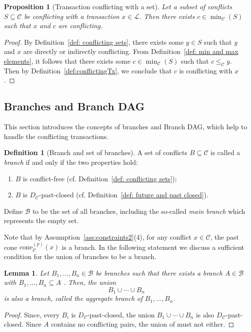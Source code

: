 \documentclass[11pt]{article}
\newcommand{\branchset}{\mathcal{B}}
\newcommand{\conflictset}{\mathcal{C}}
\newcommand{\ledger}{\mathcal{L}}
\newcommand{\ConflictDAG}{D_{\conflictset}}
\newcommand{\cone}[3]{\mathrm{cone}_{#2}^{(#1)}\left(#3\right)}
\theoremstyle{plain}
\newtheorem{lemma}{Lemma}
\newtheorem{proposition}{Proposition}
\theoremstyle{definition}
\newtheorem{definition}{Definition}
\numberwithin{definition}{section}
\numberwithin{lemma}{section}
\numberwithin{ass}{section}
\numberwithin{remark}{section}
\numberwithin{example}{section}
\numberwithin{proposition}{section}
\numberwithin{theorem}{section}
\begin{document}
\begin{proposition}[Transaction conflicting with a set]\label{prop: only minimal elements in branch}
Let a subset of conflicts $S\subseteq \conflictset$ be conflicting with a transaction $x\in \ledger$. Then there exists $c\in\min_{\conflictset}(S)$ such that $x$ and $c$ are conflicting.
\end{proposition} 

 \begin{proof}
By Definition~\ref{def: conflicting sets}, there exists some $y\in S$ such that $y$ and $x$ are directly or indirectly conflicting. From Definition~\ref{def: min and max elements}, it follows that there exists some $c\in\min_{\conflictset}(S)$  such that $c\le_{\conflictset} y$. Then by Definition~\ref{def:conflictingTx}, we conclude that $c$ is  conflicting with $x$.
 \end{proof}


\subsection{Branches and Branch DAG}\label{sec:branchDAG}

This section introduces the concepts of branches and Branch DAG, which help to handle the conflicting transactions. 



\begin{definition}[Branch and set of branches]\label{def:branch}
A set of conflicts ${B}\subseteq \conflictset$ is called a \emph{branch} if and only if the two properties hold:
\begin{enumerate}[leftmargin=*]
    \item ${B}$ is conflict-free (cf. Definition~\ref{def: conflicting sets});
    \item ${B}$ is $\ConflictDAG$-past-closed (cf. Definition~\ref{def: future and past closed}).
\end{enumerate}
Define $\branchset$ to be the set of all branches, including  the so-called \emph{main branch} which represents the empty set. %
\end{definition}
Note that by Assumption~\ref{ass:constraints2}(4), for any conflict $x\in \conflictset$, the past cone $\cone{p}{\conflictset}{x}$ is a branch. In the following statement we discuss a sufficient condition for the union of branches to be a branch.

\begin{lemma}\label{lem:aggregateBranch}
Let ${B}_1,\dots,{B}_n\in \branchset$ be branches such that there exists a branch $A\in\branchset$ with ${B}_1,\dots,{B}_n\subseteq A$ . Then, the union  
\[{B}_1\cup\cdots\cup {B}_n\]
is also a branch, called the \emph{aggregate} branch of  ${B}_1,\dots,{B}_n$. 
\end{lemma}
\begin{proof}
Since, every ${B}_i$ is $\ConflictDAG$-past-closed, the union ${B}_1\cup\cdots\cup{B}_n$ is also $\ConflictDAG$-past-closed.  Since $ A$ contains no conflicting pairs, the union of  must not either.
\end{proof}
\end{document}
